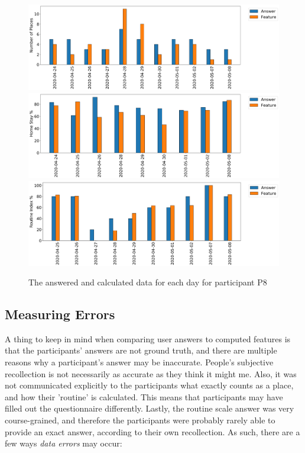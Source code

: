 \begin{figure}[h]
    \centering
    \includegraphics[width=\textwidth]{images/study/places_ec110976-0192-436d-b451-4f5dd97e71d8.png}
    \includegraphics[width=\textwidth]{images/study/homestay_ec110976-0192-436d-b451-4f5dd97e71d8.png}
    \includegraphics[width=\textwidth]{images/study/routine_ec110976-0192-436d-b451-4f5dd97e71d8.png}
    \caption{The answered and calculated data for each day for participant P8}
    \label{fig:plot-p8-features}
\end{figure}


\subsection{Measuring Errors}
A thing to keep in mind when comparing user answers to computed features is that the participants' answers are not ground truth, and there are multiple reasons why a participant's answer may be inaccurate. People's subjective recollection is not necessarily as accurate as they think it might me. Also, it was not communicated explicitly to the participants what exactly counts as a place, and how their 'routine' is calculated. This means that participants may have filled out the questionnaire differently. Lastly, the routine scale answer was very course-grained, and therefore the participants were probably rarely able to provide an exact answer, according to their own recollection. As such, there are a few ways \textit{data errors} may occur:

